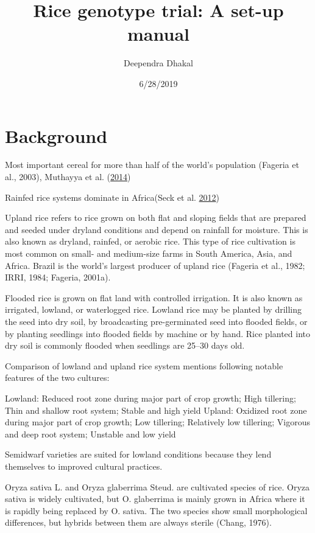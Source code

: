 \documentclass[12pt,]{article}
\title{Rice genotype trial: A set-up manual}
\author{Deependra Dhakal}
\date{6/28/2019}
\begin{document}
\maketitle

\hypertarget{background}{%
\section{Background}\label{background}}

Most important cereal for more than half of the world's population (Fageria et al., 2003), Muthayya et al. (\protect\hyperlink{ref-muthayya2014overview}{2014})

Rainfed rice systems dominate in Africa(Seck et al. \protect\hyperlink{ref-seck2012crops}{2012})

Upland rice refers to rice grown on both flat and sloping fields that are prepared and seeded under dryland conditions and depend on rainfall for moisture. This is also known as dryland, rainfed, or aerobic rice. This type of rice cultivation is most common on small- and medium-size farms in South America, Asia, and Africa. Brazil is the world's largest producer of upland rice (Fageria et al., 1982; IRRI, 1984; Fageria, 2001a).

Flooded rice is grown on flat land with controlled irrigation. It is also known as irrigated, lowland, or waterlogged rice. Lowland rice may be planted by drilling the seed into dry soil, by broadcasting pre-germinated seed into flooded fields, or by planting seedlings into flooded fields by machine or by hand. Rice planted into dry soil is commonly flooded when seedlings are 25--30 days old.

Comparison of lowland and upland rice system mentions following notable features of the two cultures:

Lowland: Reduced root zone during major part of crop growth; High tillering; Thin and
shallow root system; Stable and high yield
Upland: Oxidized root zone during major part of crop growth; Low tillering; Relatively low tillering; Vigorous and deep root system; Unstable and low yield

Semidwarf varieties are suited for lowland conditions because they lend themselves to improved cultural practices.

Oryza sativa L. and Oryza glaberrima Steud. are cultivated species of rice. Oryza sativa is widely cultivated, but O. glaberrima is mainly grown in Africa where it is rapidly being replaced by O. sativa. The two species show small morphological differences, but hybrids between them are always sterile (Chang, 1976).
\end{document}
